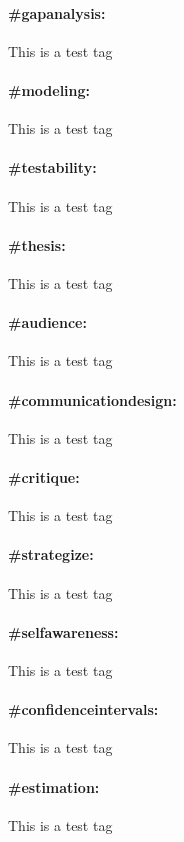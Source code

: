 \documentclass[./main.tex]{subfiles}
\begin{document}
\paragraph*{\textbf{\#gapanalysis:}}\label{hc:gapanalysis} This is a test tag
\paragraph*{\textbf{\#modeling:}}\label{hc:modeling} This is a test tag
\paragraph*{\textbf{\#testability:}}\label{hc:testability} This is a test tag
\paragraph*{\textbf{\#thesis:}}\label{hc:thesis} This is a test tag
\paragraph*{\textbf{\#audience:}}\label{hc:audience} This is a test tag
\paragraph*{\textbf{\#communicationdesign:}}\label{hc:communicationdesign} This is a test tag
\paragraph*{\textbf{\#critique:}}\label{hc:critique} This is a test tag
\paragraph*{\textbf{\#strategize:}}\label{hc:strategize} This is a test tag
\paragraph*{\textbf{\#selfawareness:}}\label{hc:selfawareness} This is a test tag

\paragraph*{\textbf{\#confidenceintervals:}}\label{hc:confidenceintervals} This is a test tag
\paragraph*{\textbf{\#estimation:}}\label{hc:estimation} This is a test tag
\end{document}
